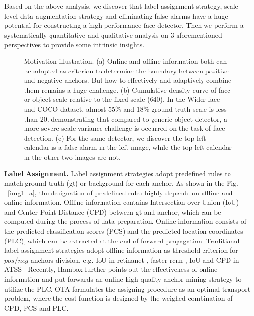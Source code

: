 \documentclass[10pt,twocolumn,letterpaper]{article}
\begin{document}
Based on the above analysis, we discover that label assignment strategy, scale-level data augmentation strategy and eliminating false alarms have a huge potential for constructing a high-performance face detector. 
Then we perform a systematically quantitative and qualitative analysis  on 3 aforementioned perspectives to provide some intrinsic insights.

\begin{figure*}[t]
    \caption{Motivation illustration. (a) 
    Online and offline information both can be adopted as criterion to determine the boundary between positive and negative anchors. But how to effectively and adaptively combine them remains a huge challenge.
    (b) Cumulative density curve of face or object scale relative to the fixed scale (640). In the Wider face and COCO dataset, almost 55\% and 18\% ground-truth scale is less than 20, demonstrating that compared to generic object detector, a more severe scale variance challenge is occurred on the task of face detection. (c) For the same detector, we discover the top-left calendar is a false alarm in the left image, while  the top-left calendar in the other two images are not.}
    \label{img1}
\end{figure*}

\noindent\textbf{Label Assignment.} Label assignment strategies adopt predefined rules to match ground-truth (gt) or background for each anchor. As shown in the Fig. ~\ref{img1_a}, the designation of predefined rules highly depends on  offline and online information. Offline information contains Intersection-over-Union (IoU) and Center Point Distance (CPD) between gt and anchor, which can be computed during the process of data preparation. Online information consists of the predicted classification scores (PCS) and the predicted location coordinates (PLC), which can be extracted at the end of forward propagation. Traditional label assignment strategies adopt offline information as threshold criterion for $pos/neg$ anchors division, e.g. IoU in retinanet \cite{lin2017focal}, faster-rcnn \cite{ren2015faster}, IoU and CPD in ATSS \cite{zhang2020bridging}. Recently, Hambox \cite{liu2019hambox} further points out the effectiveness of online information and put forwards an online high-quality anchor mining strategy to utilize the PLC. OTA \cite{ge2021ota} formulates the assigning procedure as an optimal transport problem, where the cost function is  designed by the weighed combination of CPD, PCS and PLC. 
\end{document}

